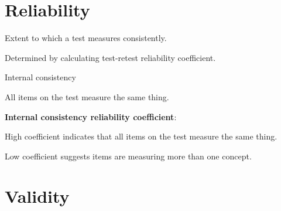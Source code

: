 \section{Reliability}

\begin{coloredlist}
    \item Extent to which a test measures consistently.
    \begin{coloredlist}
        \item Determined by calculating test-retest reliability coefficient.
    \end{coloredlist}
    \item Internal consistency
    \begin{coloredlist}
        \item All items on the test measure the same thing.
        \item \textbf{Internal consistency reliability coefficient}:
        \begin{coloredlist}
            \item High coefficient indicates that all items on the test measure the same thing.
            \item Low coefficient suggests items are measuring more than one concept.
        \end{coloredlist}
    \end{coloredlist}
\end{coloredlist}

\section{Validity}

